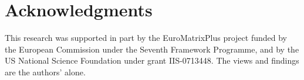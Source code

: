 \documentclass[nologo]{pbml}
\begin{document}


\section*{Acknowledgments}
This research was supported in part by the EuroMatrixPlus project funded by
the European Commission under the Seventh Framework Programme, and by the US National Science Foundation under grant IIS-0713448.  The views and findings are the authors' alone. 


\end{document}
